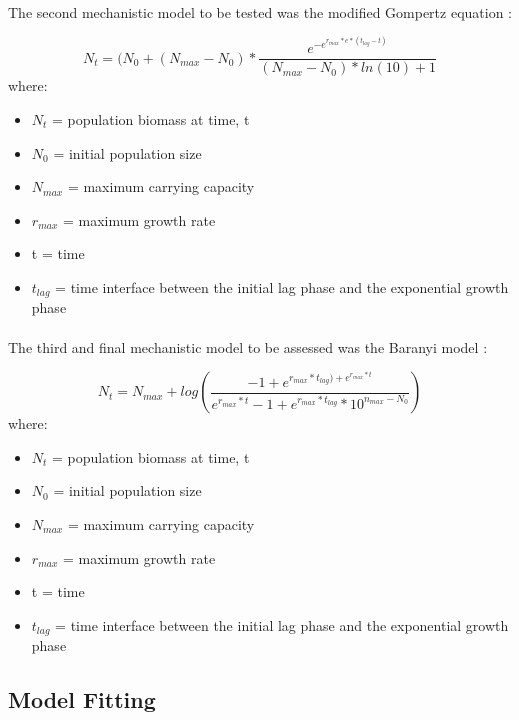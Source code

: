 \documentclass[11pt, a4paper]{article} %
\begin{document}
\paragraph{} The second mechanistic model to be tested was the modified Gompertz equation \citep{RN73}: 

\begin{equation}
N_t = (N_0 + (N_{max} - N_0) * \frac{e^{-e^{r_{max} * e * (t_{lag} - t)}}} {(N_{max} - N_0) * ln(10) + 1}
\label{eqn:Gompertz}
\end{equation}
where:
\begin{itemize}
\item $N_t$ = population biomass at time, t
\item $N_0$ = initial population size
\item $N_{max}$ = maximum carrying capacity
\item $r_{max}$ = maximum growth rate 
\item t = time
\item $t_{lag}$ = time interface between the initial lag phase and the exponential growth phase
\end{itemize}

\paragraph{} The third and final mechanistic model to be assessed was the Baranyi model \citep{RN110}:

\begin{equation}
N_t = N_{max} + log(\frac{-1 + e^{r_{max} * t_{lag}) + e^{r_{max} * t}}}{e^{r_{max} * t} - 1 + e^{r_{max} * t_{lag}} * 10^{n_{max} - N_0}})
\label{eqn:Baranyi}
\end{equation}
where:
\begin{itemize}
\item $N_t$ = population biomass at time, t
\item $N_0$ = initial population size
\item $N_{max}$ = maximum carrying capacity
\item $r_{max}$ = maximum growth rate
\item t = time
\item $t_{lag}$ = time interface between the initial lag phase and the exponential growth phase
\end{itemize}

\subsection{Model Fitting}
\end{document}
